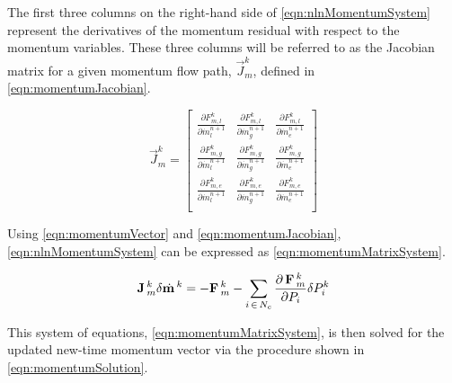 The first three columns on the right-hand side of \eqref{eqn:nlnMomentumSystem} represent the derivatives of the momentum residual with respect to the momentum variables.
These three columns will be referred to as the Jacobian matrix for a given momentum flow path, $\vec{J}^{k}_{m}$, defined in \eqref{eqn:momentumJacobian}.

\begin{equation}
\label{eqn:momentumJacobian}
\vec{J}^{k}_{m} = 
\begin{bmatrix}
\frac{\partial F^{k}_{m,l}}{\partial \dot{m}^{n+1}_{l}} & \frac{\partial F^{k}_{m,l}}{\partial \dot{m}^{n+1}_{g}} & \frac{\partial F^{k}_{m,l}}{\partial \dot{m}^{n+1}_{e}} \\
\frac{\partial F^{k}_{m,g}}{\partial \dot{m}^{n+1}_{l}} & \frac{\partial F^{k}_{m,g}}{\partial \dot{m}^{n+1}_{g}} & \frac{\partial F^{k}_{m,g}}{\partial \dot{m}^{n+1}_{e}} \\
\frac{\partial F^{k}_{m,e}}{\partial \dot{m}^{n+1}_{l}} & \frac{\partial F^{k}_{m,e}}{\partial \dot{m}^{n+1}_{g}} & \frac{\partial F^{k}_{m,e}}{\partial \dot{m}^{n+1}_{e}} \\
\end{bmatrix}
\end{equation}

Using \eqref{eqn:momentumVector} and \eqref{eqn:momentumJacobian}, \eqref{eqn:nlnMomentumSystem} can be expressed as \eqref{eqn:momentumMatrixSystem}.

\begin{equation}
\label{eqn:momentumMatrixSystem}
\vec{J}^{k}_{m} \delta \momVec{}^{k}  = - \vec{F}^{k}_{m} - \sum_{i\, \in \, N_{c}} \frac{\partial\, \vec{F}^{k}_{m}}{\partial P_{i}} \delta P_{i}^{k}
\end{equation}

This system of equations, \eqref{eqn:momentumMatrixSystem}, is then solved for the updated new-time momentum vector via the procedure shown in \eqref{eqn:momentumSolution}.

